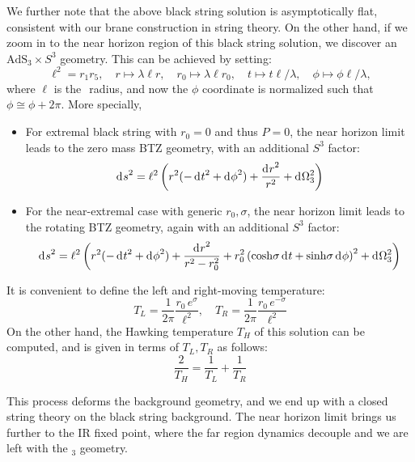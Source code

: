 \documentclass[11pt,a4paper]{article}
\newcommand{\ads}[1]{\text{AdS}\ensuremath{_{#1}}}
\begin{document}
	We further note that the above black string solution is asymptotically flat, consistent with our brane construction in string theory. On the other hand, if we zoom in to the near horizon region of this black string solution, we discover an $\ads{3}\times S^3$ geometry. This can be achieved by setting:
	\begin{equation}
		\ell^2 = r_1 r_5,
	\quad r\mapsto \lambda\ell r,
	\quad r_0\mapsto \lambda\ell r_0,
	\quad t\mapsto t\ell / \lambda,
	\quad \phi\mapsto \phi\ell / \lambda,
	\end{equation}
	where $\ell$ is the \ads{} radius, and now the $\phi$ coordinate is normalized such that $\phi \cong \phi + 2\pi$. 
	More specially,
	\begin{itemize}
	\item For extremal black string with $r_0 = 0$ and thus $P = 0$, the near horizon limit leads to the zero mass BTZ geometry, with an additional $S^3$ factor:
	\begin{equation}
		\mathinner{\mathrm{d}^{}s}^2
		= \ell^2 \left(
			r^2 (-\mathinner{\mathrm{d}^{}t}^2 + \mathinner{\mathrm{d}^{}\phi}^2)
			+ \frac{\mathinner{\mathrm{d}^{}r}^2}{r^2}
			+ \mathinner{\mathrm{d}^{}\Omega_3^2}
		\right)
	\end{equation}
	
	\item For the near-extremal case with generic $r_0, \sigma$, the near horizon limit leads to the rotating BTZ geometry, again with an additional $S^3$ factor:
	\begin{equation}
		\mathinner{\mathrm{d}^{}s}^2
		= \ell^2 \left(
			r^2 (-\mathinner{\mathrm{d}^{}t}^2 + \mathinner{\mathrm{d}^{}\phi}^2)
			+ \frac{\mathinner{\mathrm{d}^{}r}^2}{r^2 - r_0^2}
			+ r_0^2 \left(
				\mathrm{cosh}\sigma \mathinner{\mathrm{d}^{}t}
				+ \mathrm{sinh}\sigma \mathinner{\mathrm{d}^{}\phi}
			\right)^2
			+ \mathinner{\mathrm{d}^{}\Omega_3^2}
		\right)
	\end{equation}
	
	\end{itemize}
	
	It is convenient to define the left and right-moving temperature:
	\begin{equation}
		T_L = \frac{1}{2\pi}
			\frac{r_0\,e^\sigma}{\ell^2},
	\quad
		T_R = \frac{1}{2\pi}
			\frac{r_0\,e^{-\sigma}}{\ell^2}
	\end{equation}
	On the other hand, the Hawking temperature $T_H$ of this solution can be computed, and is given in terms of $T_L,T_R$ as follows:
	\begin{equation}
		\frac{2}{T_H}
		= \frac{1}{T_L}
		+ \frac{1}{T_R}
	\end{equation}
	
	 This process deforms the background geometry, and we end up with a closed string theory on the black string background. The near horizon limit brings us further to the IR fixed point, where the far region dynamics decouple and we are left with the \ads{3} geometry. 
	
\end{document}
